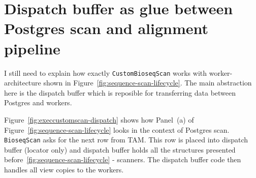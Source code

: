 \section{Dispatch buffer as glue between Postgres scan and alignment pipeline}
\label{sec:match-placeholder-injection}

I still need to explain how exactly \texttt{CustomBioseqScan} works with worker-architecture shown in Figure~\ref{fig:sequence-scan-lifecycle}.
The main abstraction here is the dispatch buffer which is reposible for transferring data between Postgres and workers.

Figure~\ref{fig:execcustomscan-dispatch} shows how Panel~(a) of Figure~\ref{fig:sequence-scan-lifecycle} looks in the context of Postgres scan.
\texttt{BioseqScan} asks for the next row from TAM. This row is placed into dispatch buffer (locator only) and dispatch buffer holds all the structures presented before~\ref{fig:sequence-scan-lifecycle} - scanners.
The dispatch buffer code then handles all view copies to the workers.

